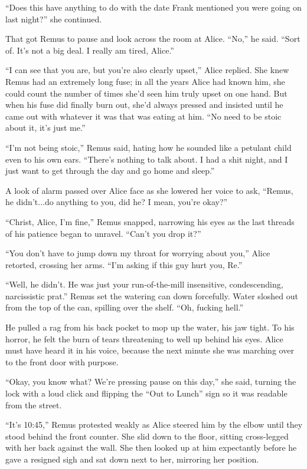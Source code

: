 “Does this have anything to do with the date Frank mentioned you were going on last night?” she continued.

That got Remus to pause and look across the room at Alice. “No,” he said. “Sort of. It’s not a big deal. I really am tired, Alice.”

“I can see that you are, but you’re also clearly upset,” Alice replied. She knew Remus had an extremely long fuse; in all the years Alice had known him, she could count the number of times she’d seen him truly upset on one hand. But when his fuse did finally burn out, she’d always pressed and insisted until he came out with whatever it was that was eating at him. “No need to be stoic about it, it’s just me.”

“I’m not being stoic,” Remus said, hating how he sounded like a petulant child even to his own ears. “There’s nothing to talk about. I had a shit night, and I just want to get through the day and go home and sleep.”

A look of alarm passed over Alice face as she lowered her voice to ask, “Remus, he didn’t...do anything to you, did he? I mean, you’re okay?”

“Christ, Alice, I’m fine,” Remus snapped, narrowing his eyes as the last threads of his patience began to unravel. “Can’t you drop it?”

“You don’t have to jump down my throat for worrying about you,” Alice retorted, crossing her arms. “I’m asking if this guy hurt you, Re.”

“Well, he didn’t. He was just your run-of-the-mill insensitive, condescending, narcissistic prat.” Remus set the watering can down forcefully. Water sloshed out from the top of the can, spilling over the shelf. “Oh, fucking hell.”

He pulled a rag from his back pocket to mop up the water, his jaw tight. To his horror, he felt the burn of tears threatening to well up behind his eyes. Alice must have heard it in his voice, because the next minute she was marching over to the front door with purpose.

“Okay, you know what? We’re pressing pause on this day,” she said, turning the lock with a loud click and flipping the “Out to Lunch” sign so it was readable from the street.

“It’s 10:45,” Remus protested weakly as Alice steered him by the elbow until they stood behind the front counter. She slid down to the floor, sitting cross-legged with her back against the wall. She then looked up at him expectantly before he gave a resigned sigh and sat down next to her, mirroring her position.

